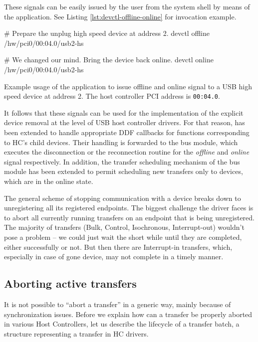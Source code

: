 These signals can be easily issued by the user from the system shell by means
of the  application. See Listing \ref{lst:devctl-offline-online}
for invocation example.

\begin{listing}
	\begin{bdsh}
		# Prepare the unplug high speed device at address 2.
		devctl offline /hw/pci0/00:04.0/usb2-hs

		# We changed our mind. Bring the device back online.
		devctl online /hw/pci0/00:04.0/usb2-hs
	\end{bdsh}
	\caption[Example usage of  to issue offline and online
	signal.]{Example usage of the  application to issue offline and
	online signal to a USB high speed device at address 2. The host controller
	PCI address is \texttt{00:04.0}.}
	\label{lst:devctl-offline-online}
\end{listing}

It follows that these signals can be used for the implementation of the
explicit device removal at the level of USB host controller drivers. For that
reason,  has been extended to handle appropriate DDF callbacks
for functions corresponding to HC's child devices. Their handling is forwarded
to the bus module, which executes the disconnection or the reconnection routine
for the \textit{offline} and \textit{online} signal respectively. In addition,
the transfer scheduling mechanism of the bus module has been extended to permit
scheduling new transfers only to devices, which are in the online state.

The general scheme of stopping communication with a device breaks down to
unregistering all its registered endpoints. The biggest challenge the driver
faces is to abort all currently running transfers on an endpoint that is being
unregistered. The majority of transfers (Bulk, Control, Isochronous,
Interrupt-out) wouldn't pose a problem -- we could just wait the short while
until they are completed, either successfully or not. But then there are
Interrupt-in transfers, which, especially in case of gone device, may not
complete in a timely manner.

\subsection{Aborting active transfers}

It is not possible to ``abort a transfer'' in a generic way, mainly because of
synchronization issues. Before we explain how can a transfer be properly
aborted in various Host Controllers, let us describe the lifecycle of
a transfer batch, a structure representing a transfer in HC drivers.

